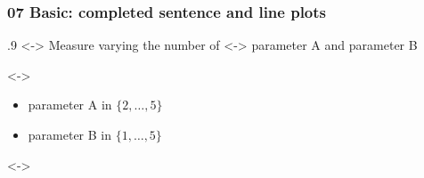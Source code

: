 
\begin{frame}
    \frametitle{07 Basic: completed sentence and line plots}

    \pgfmathsetmacro{}
    \pgfmathsetmacro{}
    \pgfmathsetmacro{}
    \pgfmathsetmacro{}

    \begin{overlayarea}{\textwidth}{.9\textheight}
        \only<\numberTextStart-\numberGraphEnd>{
            \alert{Measure} varying the number of
        }
        \only<\numberGraphStart-\numberGraphEnd>{
            \alert{parameter A} and \alert{parameter B}
        }

        \only<\numberTextStart-\numberTextEnd>{
            \vspace{1em}
            \begin{itemize}\setlength{\itemsep}{1em}
                \item \alert{parameter A} in $\{2,\ldots,5\}$
                \item \alert{parameter B} in $\{1,\ldots,5\}$
            \end{itemize}
        }

        \only<\numberGraphStart-\numberGraphEnd>{
            \vspace{1em}

            \dataTableParameterA
            \dataTableParameterB


}
\end{overlayarea}
\end{frame}
